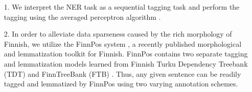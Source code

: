\documentclass[11pt]{article}
\begin{document}
\begin{itemize}

\item[1.] We interpret the NER task as a sequential tagging task and perform the tagging using the averaged perceptron algorithm \citep{collins2002}.

\item[2.] In order to alleviate data sparseness caused by the rich morphology of Finnish, we utilize the FinnPos system \citep{silfverberg2016}, a recently published morphological and lemmatization toolkit for Finnish. FinnPos contains two separate tagging and lemmatization models learned from Finnish Turku Dependency Treebank (TDT) \citep{haverinen2014} and FinnTreeBank (FTB) \citep{voutilainen2011}. Thus, any given sentence can be readily tagged and lemmatized by FinnPos using two varying annotation schemes.


 \end{itemize}

%
%
\end{document}
